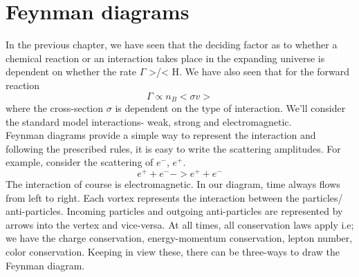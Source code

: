 \documentclass[12pt,a4paper,oneside]{book}
\begin{document}
\section{Feynman diagrams}
In the previous chapter, we have seen that the deciding factor as to whether a chemical reaction or an interaction takes place in the expanding universe is dependent on whether the rate $\Gamma$  >/< H. We have also seen that for the forward reaction 
\begin{equation}
    \Gamma \propto n_{B}<\sigma v>
\end{equation}
where the cross-section $\sigma$ is dependent on the type of interaction. We'll consider the standard model interactions- weak, strong and electromagnetic. \\
Feynman diagrams provide a simple way to represent the interaction and following the prescribed rules, it is easy to write the scattering amplitudes. For example, consider the scattering of $e^{-}$, $e^{+}$.
\begin{equation*}
    e^{+} + e^{-} -> e^{+} + e^{-}
\end{equation*}
 The interaction of course is electromagnetic. In our diagram, time always flows from left to right. Each vortex represents the interaction between the particles/ anti-particles. Incoming particles and outgoing anti-particles are represented by arrows into the vertex and vice-versa. At all times, all conservation laws apply i.e; we have the charge conservation, energy-momentum conservation, lepton number, color conservation. Keeping in view these, there can be three-ways to draw the Feynman diagram.
\end{document}
